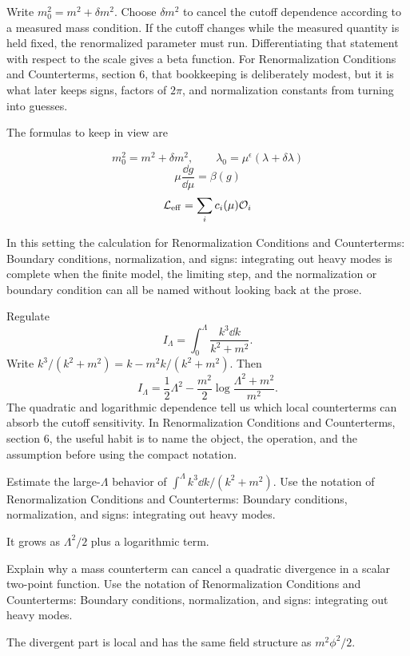 Write \(m_0^2=m^2+\delta m^2\).  Choose \(\delta m^2\) to cancel the cutoff dependence according to a measured mass condition.  If the cutoff changes while the measured quantity is held fixed, the renormalized parameter must run.  Differentiating that statement with respect to the scale gives a beta function.  For Renormalization Conditions and Counterterms, section 6, that bookkeeping is deliberately modest, but it is what later keeps signs, factors of \(2\pi\), and normalization constants from turning into guesses.

The formulas to keep in view are

\[
  m_0^2=m^2+\delta m^2,\qquad \lambda_0=\mu^\epsilon(\lambda+\delta\lambda)
\]
\[
  \mu\frac{\dd g}{\dd\mu}=\beta(g)
\]
\[
  \mathcal L_{\mathrm{eff}}=\sum_i c_i(\mu)\mathcal O_i
\]

In this setting the calculation for Renormalization Conditions and Counterterms: Boundary conditions, normalization, and signs: integrating out heavy modes is complete when the finite model, the limiting step, and the normalization or boundary condition can all be named without looking back at the prose.




\begin{example}
Regulate
\[
  I_\Lambda=\int_0^\Lambda\frac{k^3\dd k}{k^2+m^2}.
\]
Write \(k^3/(k^2+m^2)=k-m^2k/(k^2+m^2)\).  Then
\[
  I_\Lambda=\frac12\Lambda^2-\frac{m^2}{2}\log\frac{\Lambda^2+m^2}{m^2}.
\]
The quadratic and logarithmic dependence tell us which local counterterms can absorb the cutoff sensitivity.  In Renormalization Conditions and Counterterms, section 6, the useful habit is to name the object, the operation, and the assumption before using the compact notation.
\end{example}



\begin{exercise}
Estimate the large-\(\Lambda\) behavior of \(\int^\Lambda k^3\dd k/(k^2+m^2)\).  Use the notation of Renormalization Conditions and Counterterms: Boundary conditions, normalization, and signs: integrating out heavy modes.
\begin{answer}
It grows as \(\Lambda^2/2\) plus a logarithmic term.
\end{answer}
\end{exercise}

\begin{exercise}
Explain why a mass counterterm can cancel a quadratic divergence in a scalar two-point function.  Use the notation of Renormalization Conditions and Counterterms: Boundary conditions, normalization, and signs: integrating out heavy modes.
\begin{answer}
The divergent part is local and has the same field structure as \(m^2\phi^2/2\).
\end{answer}
\end{exercise}



